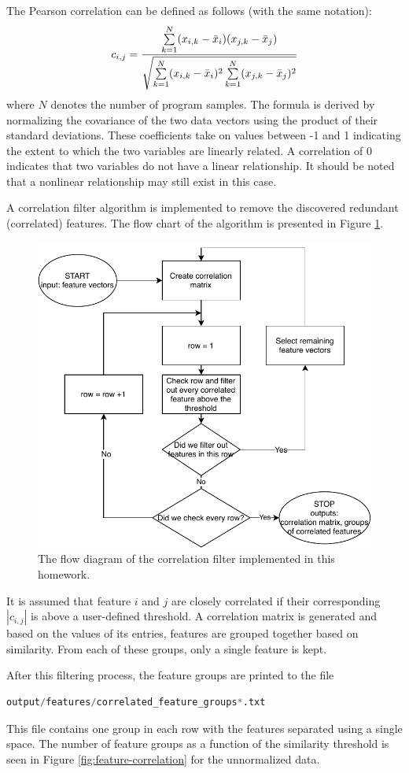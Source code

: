 \documentclass[paper=a4, fontsize=11pt]{scrartcl} %
\begin{document}
The Pearson correlation \cite{murphy2012machine} can be defined as follows (with the same notation):
\begin{equation}
\small
c_{i,j} = \frac{\sum\limits_{k=1}^{N} (x_{i,k} - \bar{x}_i)(x_{j,k} - \bar{x}_j)}
{\sqrt{\sum\limits_{k=1}^{N} (x_{i,k} - \bar{x}_i)^2 \sum\limits_{k=1}^{N} (x_{j,k} - \bar{x}_j)^2}}
\end{equation}
where $N$ denotes the number of program samples. 
The formula is derived by normalizing the covariance of the two data vectors using the product of their standard deviations.
These coefficients take on values between -1 and 1 indicating the extent to which the two variables are linearly related. 
A correlation of 0 indicates that two variables do not have a linear relationship.
It should be noted that a nonlinear relationship may still exist in this case.

A correlation filter algorithm is implemented to remove the discovered redundant (correlated) features.
The flow chart of the algorithm is presented in Figure \ref{fig:corr_filter}.

\begin{figure}[H]
	\centering
	\includegraphics[width=0.5\linewidth]{figures/correlation_filter}
	\caption{The flow diagram of the correlation filter implemented in this homework.}
	\label{fig:corr_filter}
\end{figure}


It is assumed that feature $i$ and $j$ are closely correlated if their corresponding $|c_{i,j}|$ is above a user-defined threshold.
A correlation matrix is generated and based on the values of its entries, features are grouped together based on similarity.
From each of these groups, only a single feature is kept. 

After this filtering process, the feature groups are printed to the file
\begin{lstlisting}[language=python]
output/features/correlated_feature_groups*.txt
\end{lstlisting} 
This file contains one group in each row with the features separated using a single space.
The number of feature groups as a function of the similarity threshold is seen in Figure \ref{fig:feature-correlation} for the unnormalized data.
\end{document}
